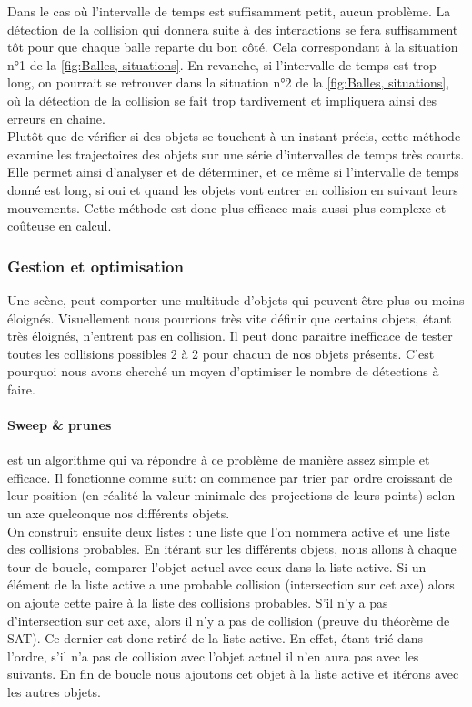Dans le cas où l'intervalle de temps est suffisamment petit, aucun problème. La détection de la collision qui donnera suite à des interactions se fera suffisamment tôt pour que chaque balle reparte du bon côté. Cela correspondant à la situation n°1 de la  \autoref{fig:Balles, situations}.
En revanche, si l'intervalle de temps est trop long, on pourrait se retrouver dans la situation n°2 de la  \autoref{fig:Balles, situations}, où la détection de la collision se fait trop tardivement et impliquera ainsi des erreurs en chaine.\\

Plutôt que de vérifier si des objets se touchent à un instant précis, cette méthode examine les trajectoires des objets sur une série d'intervalles de temps très courts. Elle permet ainsi d'analyser et de déterminer, et ce même si l'intervalle de temps donné est long, si oui et quand les objets vont entrer en collision en suivant leurs mouvements. Cette méthode est donc plus efficace mais aussi plus complexe et coûteuse en calcul.
\pagebreak

\subsubsection{Gestion et optimisation}
Une scène, peut comporter une multitude d'objets qui peuvent être plus ou moins éloignés. Visuellement nous pourrions très vite définir que certains objets, étant très éloignés, n'entrent pas en collision. Il peut donc paraitre inefficace de tester toutes les collisions possibles 2 à 2 pour chacun de nos objets présents. C'est pourquoi nous avons cherché un moyen d'optimiser le nombre de détections à faire.
\paragraph{Sweep \& prunes} \citep{Multiple} est un algorithme qui va répondre à ce problème de manière assez simple et efficace. Il fonctionne comme suit: on commence par trier par ordre croissant de leur position (en réalité la valeur minimale des projections de leurs points) selon un axe quelconque nos différents objets.\\
On construit ensuite deux listes : une liste que l'on nommera active et une liste des collisions probables. En itérant sur les différents objets, nous allons à chaque tour de boucle, comparer l'objet actuel avec ceux dans la liste active. Si un élément de la liste active a une probable collision (intersection sur cet axe) alors on ajoute cette paire à la liste des collisions probables. S'il n'y a pas d'intersection sur cet axe, alors il n'y a pas de collision (preuve du théorème de SAT). Ce dernier est donc retiré de la liste active. En effet, étant trié dans l'ordre, s'il n'a pas de collision avec l'objet actuel il n'en aura pas avec les suivants. En fin de boucle nous ajoutons cet objet à la liste active et itérons avec les autres objets.\\


